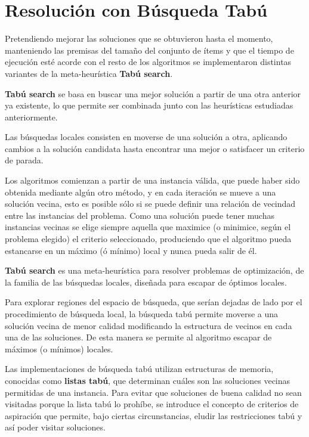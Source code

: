 \section{Resolución con Búsqueda Tabú}
Pretendiendo mejorar las soluciones que se obtuvieron hasta el momento, manteniendo las premisas del tamaño del conjunto de ítems y que el tiempo de ejecución esté acorde con el resto de los algoritmos se implementaron distintas variantes de la meta-heurística \textbf{Tabú search}. 

\textbf{Tabú search} se basa en buscar una mejor solución a partir de una otra anterior ya existente, lo que permite ser combinada junto con las heurísticas estudiadas anteriormente.

Las búsquedas locales consisten en moverse de una solución a otra, aplicando cambios a la solución candidata hasta encontrar una mejor o satisfacer un criterio de parada. 

Los algoritmos comienzan a partir de una instancia válida, que puede haber sido obtenida mediante algún otro método, y en cada iteración se mueve a una solución vecina, esto es posible sólo si se puede definir una relación de vecindad entre las instancias del problema. Como una solución puede tener muchas instancias vecinas se elige siempre aquella que maximice (o minimice, según el problema elegido) el criterio seleccionado, produciendo que el algoritmo pueda estancarse en un máximo (ó mínimo) local y nunca pueda salir de él.

\textbf{Tabú search}\cite{TS-1,TS-2} es una meta-heurística para resolver problemas de optimización, de la familia de las búsquedas locales, diseñada para escapar de óptimos locales. 

Para explorar regiones del espacio de búsqueda, que serían dejadas de lado por el procedimiento de búsqueda local, la búsqueda tabú permite moverse a una solución vecina de menor calidad modificando la estructura de vecinos en cada una de las soluciones. De esta manera se permite al algoritmo escapar de máximos (o mínimos) locales.

Las implementaciones de búsqueda tabú utilizan estructuras de memoria, conocidas como \textbf{listas tabú}, que determinan cuáles son las soluciones vecinas permitidas de una instancia. Para evitar que soluciones de buena calidad no sean visitadas porque la lista tabú lo prohíbe, se introduce el concepto de criterios de aspiración que permite, bajo ciertas circunstancias, eludir las restricciones tabú y así poder visitar soluciones.

